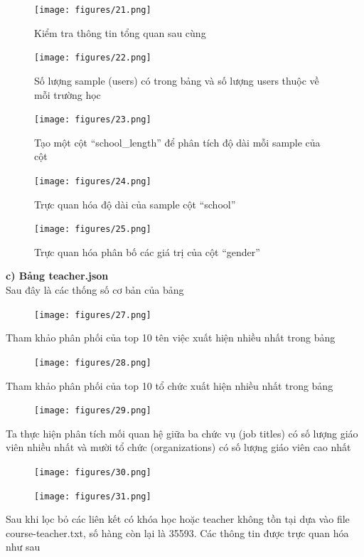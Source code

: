 \begin{figure}[H]
    \centering
    \texttt{[image: figures/21.png]}
    \caption{Kiểm tra thông tin tổng quan sau cùng}
\end{figure}
\newpage
\begin{figure}[H]
    \centering
    \texttt{[image: figures/22.png]}
    \caption{Số lượng sample (users) có trong bảng và số lượng users thuộc về mỗi trường học}
\end{figure}
\begin{figure}[H]
    \centering
    \texttt{[image: figures/23.png]}
    \caption{Tạo một cột “school\_length” để phân tích độ dài mỗi sample của cột}
\end{figure}
\newpage
\begin{figure}[H]
    \centering
    \texttt{[image: figures/24.png]}
    \caption{Trực quan hóa độ dài của sample cột “school”}
\end{figure}
\begin{figure}[H]
    \centering
    \texttt{[image: figures/25.png]}
    \caption{Trực quan hóa phân bố các giá trị của cột “gender”}
\end{figure}
\newpage
\textbf{c) Bảng teacher.json}\\
Sau đây là các thống số cơ bản của bảng
\begin{figure}[H]
    \centering
    \texttt{[image: figures/27.png]}
\end{figure}
Tham khảo phân phối của top 10 tên việc xuất hiện nhiều nhất trong bảng
\begin{figure}[H]
    \centering
    \texttt{[image: figures/28.png]}
\end{figure}
Tham khảo phân phối của top 10 tổ chức xuất hiện nhiều nhất trong bảng
\newpage
\begin{figure}[H]
    \centering
    \texttt{[image: figures/29.png]}
\end{figure}
Ta thực hiện phân tích mối quan hệ giữa ba chức vụ (job titles) có số lượng giáo viên nhiều nhất và mười tổ chức (organizations) có số lượng giáo viên cao nhất
\begin{figure}[H]
    \centering
    \texttt{[image: figures/30.png]}
\end{figure}
\newpage
\begin{figure}[H]
    \centering
    \texttt{[image: figures/31.png]}
\end{figure}
Sau khi lọc bỏ các liên kết có khóa học hoặc teacher không tồn tại dựa vào file course-teacher.txt, số hàng còn lại là 35593. Các thông tin được trực quan hóa như sau
